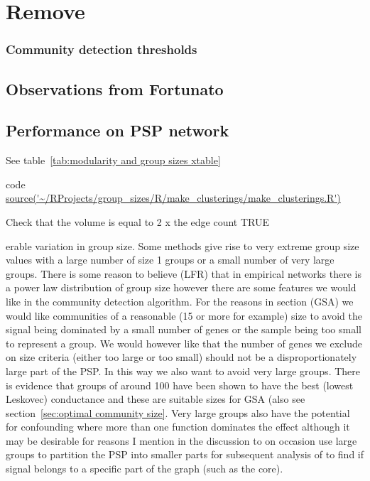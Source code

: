 \section{Remove}
\subsubsection{Community detection thresholds}

\subsection{Observations from Fortunato}

\subsection{Performance on PSP network}
\label{sec:Performance on PSP network}
See table~\ref{tab:modularity and group sizes xtable} 

code \url{source('~/RProjects/group_sizes/R/make_clusterings/make_clusterings.R')}


Check that the volume is equal to 2 x the edge count  TRUE 

erable variation in group size. Some methods give rise to very extreme group size values with a large number of size 1 groups or a small number of very large groups. There is some reason to believe (LFR) that in empirical networks there is a power law distribution of group size however there are some features we would like in the community detection algorithm. For the reasons in section (GSA) we would like communities of a reasonable (15 or more for example) size to avoid the signal being dominated by a small number of genes or the sample being too small to represent a group. We would however like that the number of genes we exclude on size criteria (either too large or too small) should not be a disproportionately large part of the PSP. In this way we also want to avoid very large groups. There is evidence that groups of around 100 have been shown to have the best (lowest Leskovec) conductance and these are suitable sizes for GSA (also see section~\ref{sec:optimal community size}. Very large groups also have the potential for confounding where more than one function dominates the effect\cite{de2016statistical} although it may be desirable for reasons I mention in the discussion to on occasion use large groups to partition the PSP into smaller parts for subsequent analysis of to find if signal belongs to a specific part of the graph (such as the core). 

